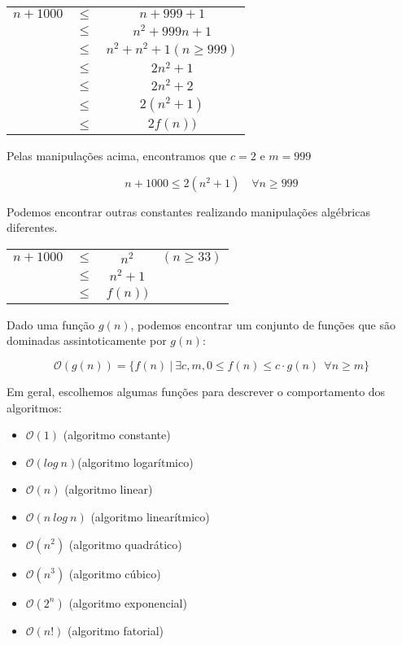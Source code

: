 \begin{tabular}{ccc}
$n + 1000$     & $\leq$ &$n + 999 + 1$ \\
             & $\leq$ & $n^2 + 999n + 1$\\
             & $\leq$ & $n^2 + n^2 + 1 (n \geq 999)$\\
             & $\leq$ & $2n^2 + 1$ \\
             & $\leq$ & $2n^2 + 2$ \\
             & $\leq$ & $2(n^2 + 1)$ \\
             & $\leq$ & $2f(n))$ \\
\end{tabular}

Pelas manipulações acima, encontramos que $c = 2$ e $m = 999$

$$n + 1000 \leq 2( n^2 + 1 ) \quad \forall n \geq 999$$

Podemos encontrar outras constantes realizando manipulações algébricas diferentes.


\begin{tabular}{cccc}
$n + 1000$     & $\leq$ & $n^2$ & $(n \geq 33)$  \\
               & $\leq$ & $n^2 + 1$  \\
               & $\leq$ & $f(n))$   \\
\end{tabular}

Dado uma função $g(n)$, podemos encontrar um conjunto de funções que são dominadas assintoticamente por $g(n)$:

$$
\mathcal{O}(g(n)) = \{f(n) ~|~ \exists c, m, 0 \leq f(n) \leq c \cdot g(n) ~~ \forall n \geq m\}
$$

Em geral, escolhemos algumas funções para descrever o comportamento dos algoritmos:

\begin{itemize}
    \item $\mathcal{O}(1)$ (algoritmo constante)
    \item $\mathcal{O}(log ~n)$(algoritmo logarítmico)
    \item $\mathcal{O}(n)$ (algoritmo linear)
    \item $\mathcal{O}(n ~log ~n)$ (algoritmo linearítmico)
    \item $\mathcal{O}(n^2)$ (algoritmo quadrático)
    \item $\mathcal{O}(n^3)$ (algoritmo cúbico)
    \item $\mathcal{O}(2^n)$ (algoritmo exponencial)
    \item $\mathcal{O}(n!)$ (algoritmo fatorial)
    
    
    
\end{itemize}

